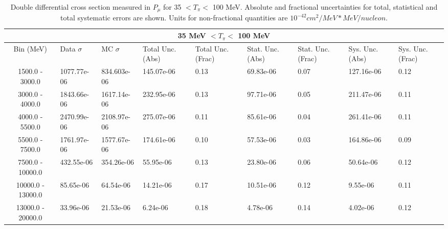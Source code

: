 

\begin{table}[!htb]
    \centering
    \tiny
    \begin{tabular}{|c|p{0.5in}|p{0.5in}|p{0.5in}|p{0.5in}|p{0.5in}|p{0.5in}|p{0.5in}|p{0.5in}|}

        \hline
        \multicolumn{9}{c}{35 MeV $ < T_\pi < $ 100 MeV}\\
        \hline
        Bin (MeV)& Data $\sigma$ & MC $\sigma$ & Total Unc. (Abs) & Total Unc. (Frac)  & Stat. Unc. (Abs) & Stat. Unc. (Frac) & Sys. Unc. (Abs) & Sys. Unc. (Frac)\\ \hline
1500.0 - 3000.0 & 1077.77e-06 & 834.603e-06 & 145.07e-06 & 0.13 & 69.83e-06 & 0.07 & 127.16e-06 & 0.12\\ \hline
3000.0 - 4000.0 & 1843.66e-06 & 1617.14e-06 & 232.95e-06 & 0.13 & 97.71e-06 & 0.05 & 211.47e-06 & 0.11\\ \hline
4000.0 - 5500.0 & 2470.99e-06 & 2108.97e-06 & 275.07e-06 & 0.11 & 85.61e-06 & 0.04 & 261.41e-06 & 0.11\\ \hline
5500.0 - 7500.0 & 1761.97e-06 & 1577.67e-06 & 174.61e-06 & 0.10 & 57.53e-06 & 0.03 & 164.86e-06 & 0.09\\ \hline
7500.0 - 10000.0 & 432.55e-06 & 354.26e-06 & 55.95e-06 & 0.13 & 23.80e-06 & 0.06 & 50.64e-06 & 0.12\\ \hline
10000.0 - 13000.0 & 85.65e-06 & 64.54e-06 & 14.21e-06 & 0.17 & 10.51e-06 & 0.12 & 9.55e-06 & 0.11\\ \hline
13000.0 - 20000.0 & 33.96e-06 & 21.53e-06 & 6.24e-06 & 0.18 & 4.78e-06 & 0.14 & 4.02e-06 & 0.12\\ \hline

    \end{tabular}
    \caption{Double differential cross section measured in $P_\mu$ for 35 $ < T_\pi < $ 100 MeV. Absolute and fractional uncertainties for total, statistical and total systematic errors are shown. Units for non-fractional quantities are $10^{-42}cm^2/MeV*MeV/nucleon$.}
    \label{tab:ApdxA:XSecTable2Dpmutpi1}
\end{table}


